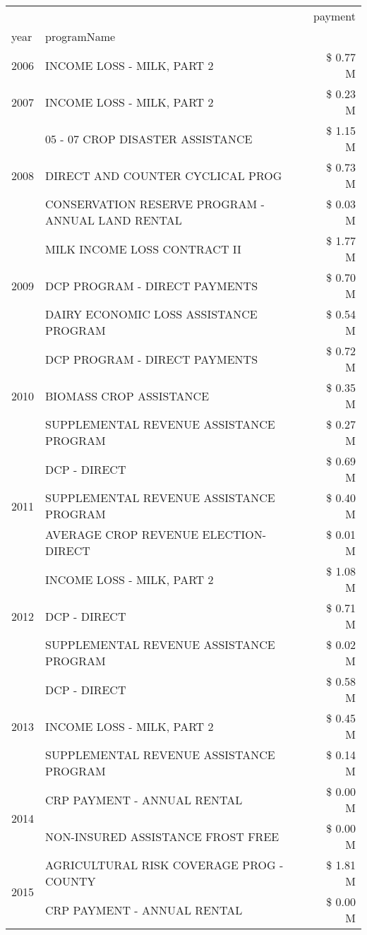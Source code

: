 \begin{tabular}{llr}
\toprule
 &  & payment \\
year & programName &  \\
\midrule
2006 & INCOME LOSS - MILK, PART 2 & \$ 0.77 M \\
\cline{1-3}
2007 & INCOME LOSS - MILK, PART 2 & \$ 0.23 M \\
\cline{1-3}
\multirow[t]{3}{*}{2008} & 05 - 07 CROP DISASTER ASSISTANCE & \$ 1.15 M \\
 & DIRECT AND COUNTER CYCLICAL PROG & \$ 0.73 M \\
 & CONSERVATION RESERVE PROGRAM - ANNUAL LAND RENTAL & \$ 0.03 M \\
\cline{1-3}
\multirow[t]{3}{*}{2009} & MILK INCOME LOSS CONTRACT II & \$ 1.77 M \\
 & DCP PROGRAM - DIRECT PAYMENTS & \$ 0.70 M \\
 & DAIRY ECONOMIC LOSS ASSISTANCE PROGRAM & \$ 0.54 M \\
\cline{1-3}
\multirow[t]{3}{*}{2010} & DCP PROGRAM - DIRECT PAYMENTS & \$ 0.72 M \\
 & BIOMASS CROP ASSISTANCE & \$ 0.35 M \\
 & SUPPLEMENTAL REVENUE ASSISTANCE PROGRAM & \$ 0.27 M \\
\cline{1-3}
\multirow[t]{3}{*}{2011} & DCP - DIRECT & \$ 0.69 M \\
 & SUPPLEMENTAL REVENUE ASSISTANCE PROGRAM & \$ 0.40 M \\
 & AVERAGE CROP REVENUE ELECTION-DIRECT & \$ 0.01 M \\
\cline{1-3}
\multirow[t]{3}{*}{2012} & INCOME LOSS - MILK, PART 2 & \$ 1.08 M \\
 & DCP - DIRECT & \$ 0.71 M \\
 & SUPPLEMENTAL REVENUE ASSISTANCE PROGRAM & \$ 0.02 M \\
\cline{1-3}
\multirow[t]{3}{*}{2013} & DCP - DIRECT & \$ 0.58 M \\
 & INCOME LOSS - MILK, PART 2 & \$ 0.45 M \\
 & SUPPLEMENTAL REVENUE ASSISTANCE PROGRAM & \$ 0.14 M \\
\cline{1-3}
\multirow[t]{2}{*}{2014} & CRP PAYMENT - ANNUAL RENTAL & \$ 0.00 M \\
 & NON-INSURED ASSISTANCE FROST FREE & \$ 0.00 M \\
\cline{1-3}
\multirow[t]{2}{*}{2015} & AGRICULTURAL RISK COVERAGE PROG - COUNTY & \$ 1.81 M \\
 & CRP PAYMENT - ANNUAL RENTAL & \$ 0.00 M \\

\end{tabular}
